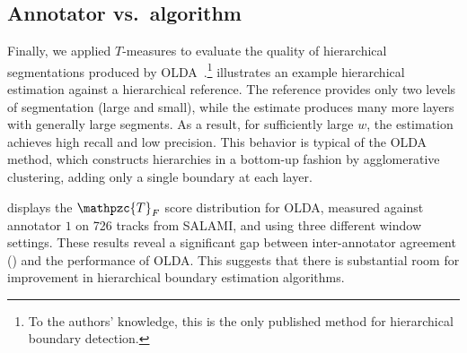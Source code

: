 \documentclass{article}
\def\shag{\ensuremath{\mathpzc{T}}}
\begin{document}
\subsection{Annotator vs.\ algorithm}
Finally, we applied $T$-measures to evaluate the quality of hierarchical segmentations produced by
OLDA~\cite{McFee2014}.\footnote{To the authors' knowledge, this is the only published method for
hierarchical boundary detection.}
 illustrates an example hierarchical estimation against a hierarchical reference.
The reference provides only two levels of segmentation (large and small), while the 
estimate produces many more layers with generally large segments.  
As a result, for sufficiently large $w$, the estimation achieves high recall and low precision.
This behavior is typical of the OLDA method, which constructs hierarchies in a bottom-up fashion by
agglomerative clustering, adding only a single boundary at each layer.

 displays the $\shag_F$ score distribution for OLDA, measured against annotator
$1$ on 726 tracks from SALAMI\@, and using three different window settings.
These results reveal a significant gap between inter-annotator agreement
() and the performance of OLDA\@.
This suggests that there is substantial room for improvement in hierarchical boundary estimation algorithms.
\end{document}
